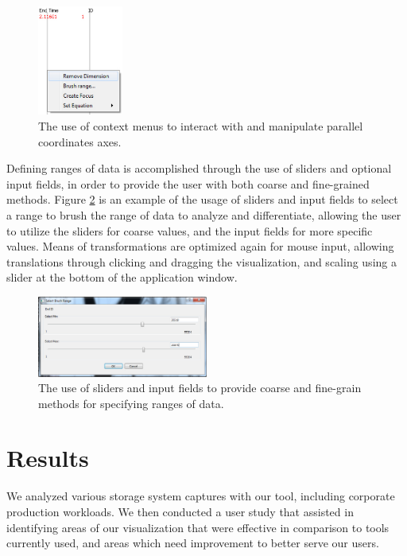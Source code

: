 \documentclass[journal]{vgtc}                %
\begin{document}
\begin{figure}[h!]
 \centering
 \includegraphics[width=0.25\textwidth]{images/context_menu.eps}
 \caption[Context menus to interact with and manipulate axes.]{The use of context menus to interact with and manipulate parallel coordinates axes.}
 \label{fig:context_menus}
\end{figure}

Defining ranges of data is accomplished through the use of sliders and optional input fields, in order to provide the user with both coarse and fine-grained methods. Figure \ref{fig:sliders_input} is an example of the usage of sliders and input fields to select a range to brush the range of data to analyze and differentiate, allowing the user to utilize the sliders for coarse values, and the input fields for more specific values. Means of transformations are optimized again for mouse input, allowing translations through clicking and dragging the visualization, and scaling using a slider at the bottom of the application window.

\begin{figure}[h!]
 \centering
 \includegraphics[width=0.5\textwidth]{images/select_range.eps}
 \caption[Sliders and input fields for specifying ranges of data.]{The use of sliders and input fields to provide coarse and fine-grain methods for specifying ranges of data.}
 \label{fig:sliders_input}
\end{figure}

\section{Results}
\label{results}
We analyzed various storage system captures with our tool, including corporate production workloads. We then conducted a user study that assisted in identifying areas of our visualization that were effective in comparison to tools currently used, and areas which need improvement to better serve our users.
\end{document}
